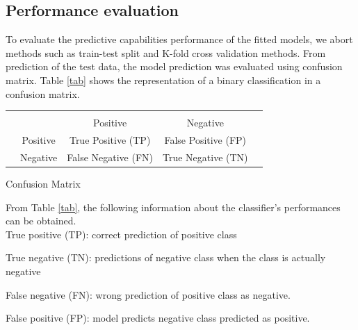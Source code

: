 \documentclass[a4paper,fleqn]{cas-dc}
\begin{document}
\subsection{Performance evaluation}
To evaluate the predictive capabilities performance of the fitted models, we abort methods such as train-test split and K-fold cross validation methods.  From prediction of the test data, the model prediction was evaluated using confusion matrix. Table \ref{tab} shows the representation of a binary classification in a confusion matrix. 


\begin{tabular}{c|c|c|c|c}
	
	\multicolumn{2}{c}{}&\multicolumn{2}{c}{}&\\
	\cline{3-4}
	\multicolumn{2}{c|}{}&Positive&Negative&\multicolumn{1}{c}{}\\
	\cline{2-4}
	\multirow{2}{*}{}& Positive & True Positive (TP) &False Positive (FP) & \\
	\cline{2-4}
	& Negative & False Negative (FN) & True Negative (TN) & \\
	\cline{2-4}
	
\end{tabular}
\captionsetup{type=table} 
\caption{Confusion Matrix }
\label{tab}


From Table \ref{tab}, the following information about the classifier's performances can be obtained.\\

True positive (TP): correct prediction of positive class

True negative (TN): predictions of negative class when the class is actually negative 

False negative (FN): wrong prediction of positive class as negative.

False positive (FP): model predicts negative class predicted as positive.

\end{document}
